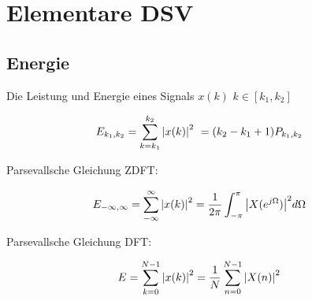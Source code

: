 \documentclass[10pt,a4paper]{article}
\begin{document}
\twocolumn
\pagestyle{fancy}
\section{Elementare DSV}
  \subsection{Energie}
  Die Leistung und Energie eines Signals $x(k)$ $k \in [k_1,k_2]$
  \begin{mdframed}[style=exercise]
    \begin{align}
        E_{k_1,k_2} &=\sum_{k=k_1}^{k_2} \abs{x(k)}^2 \ = (k_2 - k_1 +1) P_{k_1,k_2} 
    \end{align}
  \end{mdframed}
  Parsevallsche Gleichung ZDFT:
  \begin{mdframed}[style=exercise]
    \begin{align}
        E_{-\infty,\infty} &=\sum_{-\infty}^{\infty} \abs{x(k)}^2 = \frac{1}{2\pi}\displaystyle\int_{-\pi}^{\pi} \abs{X(e^{j\Omega})}^2 d\Omega
    \end{align}
  \end{mdframed}
  Parsevallsche Gleichung DFT:
  \begin{mdframed}[style=exercise]
    \begin{align}
        E &=\sum_{k=0}^{N-1} \abs{x(k)}^2 =\frac{1}{N}\sum_{n=0}^{N-1} \abs{X(n)}^2 
    \end{align}
  \end{mdframed}
\end{document}
